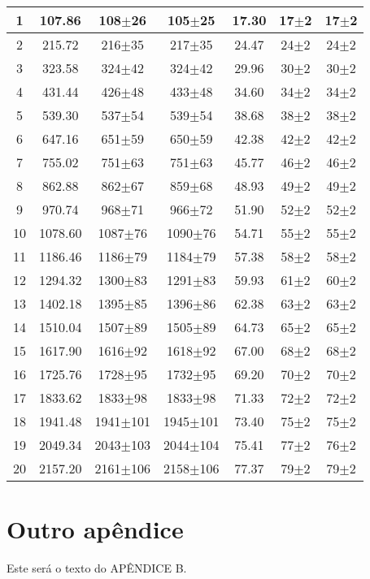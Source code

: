 \begin{table}
\begin{tabular}{|c|c|c|c|c|c|c|}
1&107.86&108$\pm$26&105$\pm$25&17.30&17$\pm$2&17$\pm$2\\ \hline 
2&215.72&216$\pm$35&217$\pm$35&24.47&24$\pm$2&24$\pm$2\\ \hline 
3&323.58&324$\pm$42&324$\pm$42&29.96&30$\pm$2&30$\pm$2\\ \hline 
4&431.44&426$\pm$48&433$\pm$48&34.60&34$\pm$2&34$\pm$2\\ \hline 
5&539.30&537$\pm$54&539$\pm$54&38.68&38$\pm$2&38$\pm$2\\ \hline 
6&647.16&651$\pm$59&650$\pm$59&42.38&42$\pm$2&42$\pm$2\\ \hline 
7&755.02&751$\pm$63&751$\pm$63&45.77&46$\pm$2&46$\pm$2\\ \hline 
8&862.88&862$\pm$67&859$\pm$68&48.93&49$\pm$2&49$\pm$2\\ \hline 
9&970.74&968$\pm$71&966$\pm$72&51.90&52$\pm$2&52$\pm$2\\ \hline 
10&1078.60&1087$\pm$76&1090$\pm$76&54.71&55$\pm$2&55$\pm$2\\ \hline 
11&1186.46&1186$\pm$79&1184$\pm$79&57.38&58$\pm$2&58$\pm$2\\ \hline 
12&1294.32&1300$\pm$83&1291$\pm$83&59.93&61$\pm$2&60$\pm$2\\ \hline 
13&1402.18&1395$\pm$85&1396$\pm$86&62.38&63$\pm$2&63$\pm$2\\ \hline 
14&1510.04&1507$\pm$89&1505$\pm$89&64.73&65$\pm$2&65$\pm$2\\ \hline 
15&1617.90&1616$\pm$92&1618$\pm$92&67.00&68$\pm$2&68$\pm$2\\ \hline 
16&1725.76&1728$\pm$95&1732$\pm$95&69.20&70$\pm$2&70$\pm$2\\ \hline 
17&1833.62&1833$\pm$98&1833$\pm$98&71.33&72$\pm$2&72$\pm$2\\ \hline 
18&1941.48&1941$\pm$101&1945$\pm$101&73.40&75$\pm$2&75$\pm$2\\ \hline 
19&2049.34&2043$\pm$103&2044$\pm$104&75.41&77$\pm$2&76$\pm$2\\ \hline 
20&2157.20&2161$\pm$106&2158$\pm$106&77.37&79$\pm$2&79$\pm$2\\ \hline 
\end{tabular} 
\end{table} 


\chapter{Outro apêndice}

Este será o texto do APÊNDICE B.

